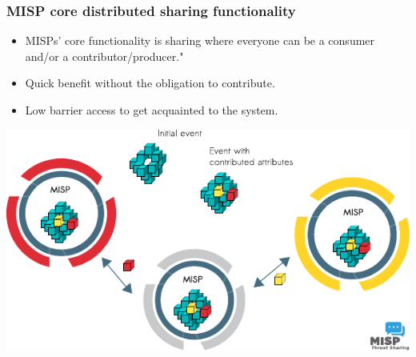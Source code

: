\begin{frame}
\frametitle{MISP core distributed sharing functionality}
\begin{itemize}
\item MISPs' core functionality is sharing where everyone can be a consumer and/or a contributor/producer."
\item Quick benefit without the obligation to contribute.
\item Low barrier access to get acquainted to the system.
\end{itemize}
\includegraphics[scale=0.9]{misp-distributed.pdf}
\end{frame}


